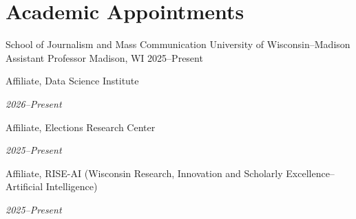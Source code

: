 \section{Academic Appointments}

\cventry
  {School of Journalism and Mass Communication \textperiodcentered{} University of Wisconsin--Madison}
  {Assistant Professor}
  {Madison, WI}
  {2025--Present}
  {\item \parbox[t]{\dimexpr\linewidth-2.9cm\relax}{\strut\raggedright Affiliate, Data Science Institute}\hfill\parbox[t]{2.6cm}{\strut\raggedleft\itshape\color{muted}2026--Present}
   \item \parbox[t]{\dimexpr\linewidth-2.9cm\relax}{\strut\raggedright Affiliate, Elections Research Center}\hfill\parbox[t]{2.6cm}{\strut\raggedleft\itshape\color{muted}2025--Present}
   \item \parbox[t]{\dimexpr\linewidth-2.9cm\relax}{\strut\raggedright Affiliate, RISE-AI (Wisconsin Research, Innovation and Scholarly Excellence--Artificial Intelligence)}\hfill\parbox[t]{2.6cm}{\strut\raggedleft\itshape\color{muted}2025--Present}}
